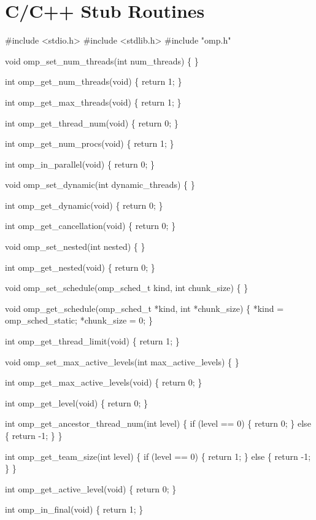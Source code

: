 \section{C/C++ Stub Routines}
\label{sec:C/C++ Stub Routines}
{\small \begin{codepar}
\#include <stdio.h>
\#include <stdlib.h>
\#include "omp.h"

void omp\_set\_num\_threads(int num\_threads)
\{
\}

int omp\_get\_num\_threads(void)
\{
    return 1;
\}

int omp\_get\_max\_threads(void)
\{
    return 1;
\}

int omp\_get\_thread\_num(void)
\{
    return 0;
\}

int omp\_get\_num\_procs(void)
\{
    return 1;
\}

int omp\_in\_parallel(void)
\{
    return 0;
\}

void omp\_set\_dynamic(int dynamic\_threads)
\{
\}

int omp\_get\_dynamic(void)
\{
    return 0;
\}

int omp\_get\_cancellation(void)
\{
    return 0;
\}

void omp\_set\_nested(int nested)
\{
\}

int omp\_get\_nested(void)
\{
    return 0;
\}

void omp\_set\_schedule(omp\_sched\_t kind, int chunk\_size)
\{
\}

void omp\_get\_schedule(omp\_sched\_t *kind, int *chunk\_size)
\{
    *kind = omp\_sched\_static;
    *chunk\_size = 0;
\}

int omp\_get\_thread\_limit(void)
\{
    return 1;
\}

void omp\_set\_max\_active\_levels(int max\_active\_levels)
\{
\}

int omp\_get\_max\_active\_levels(void)
\{
    return 0;
\}

int omp\_get\_level(void)
\{
    return 0;
\}

int omp\_get\_ancestor\_thread\_num(int level)
\{
    if (level == 0)
    \{
        return 0;
    \}
    else
    \{
        return -1;
    \}
\}

int omp\_get\_team\_size(int level)
\{
    if (level == 0)
    \{
        return 1;
    \}
    else
    \{
        return -1;
    \}
\}

int omp\_get\_active\_level(void)
\{
    return 0;
\}

int omp\_in\_final(void)
\{
    return 1;
\}


\end{codepar}}
